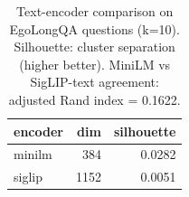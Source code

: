 \begin{table}[t]
\centering
\small
\caption{Text-encoder comparison on EgoLongQA questions (k=10). Silhouette: cluster separation (higher better). MiniLM vs SigLIP-text agreement: adjusted Rand index = 0.1622.}
\label{tab:encoder_cmp}
\begin{tabular}{lrr}
\toprule
encoder & dim & silhouette \\
\midrule
minilm & 384 & 0.0282 \\
siglip & 1152 & 0.0051 \\
\bottomrule
\end{tabular}
\end{table}
